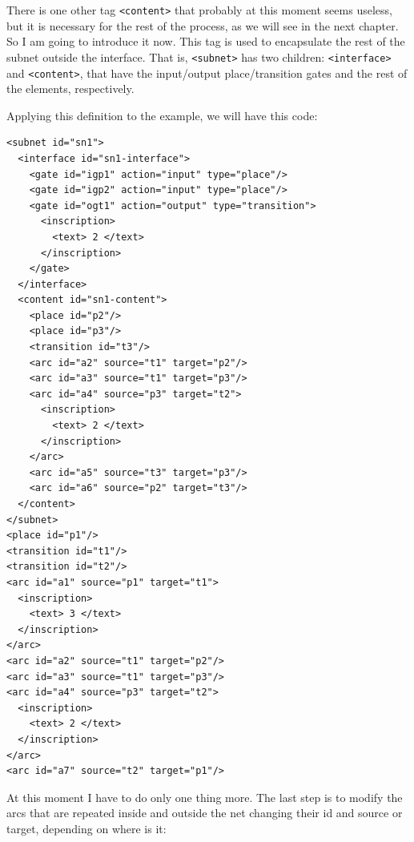 There is one other tag \texttt{<content>} that
probably at this moment seems useless, but it is necessary for the rest of the process, as we will see in the next chapter. So I am going to introduce it now. This tag is used to encapsulate the rest of the subnet outside the interface. That is, \texttt{<subnet>} has two children:
\texttt{<interface>} and \texttt{<content>},
that have the input/output place/transition gates and the rest of the elements, respectively.

Applying this definition to the example, we will have this code:

\begin{lstlisting}
<subnet id="sn1">
  <interface id="sn1-interface">
    <gate id="igp1" action="input" type="place"/>
    <gate id="igp2" action="input" type="place"/>
    <gate id="ogt1" action="output" type="transition">
      <inscription>
        <text> 2 </text>
      </inscription>
    </gate>
  </interface>
  <content id="sn1-content">
    <place id="p2"/>
    <place id="p3"/>
    <transition id="t3"/>
    <arc id="a2" source="t1" target="p2"/>
    <arc id="a3" source="t1" target="p3"/>
    <arc id="a4" source="p3" target="t2">
      <inscription>
        <text> 2 </text>
      </inscription>
    </arc>
    <arc id="a5" source="t3" target="p3"/>
    <arc id="a6" source="p2" target="t3"/>
  </content>
</subnet>
<place id="p1"/>
<transition id="t1"/>
<transition id="t2"/>
<arc id="a1" source="p1" target="t1">
  <inscription>
    <text> 3 </text>
  </inscription>
</arc>
<arc id="a2" source="t1" target="p2"/>
<arc id="a3" source="t1" target="p3"/>
<arc id="a4" source="p3" target="t2">
  <inscription>
    <text> 2 </text>
  </inscription>
</arc>
<arc id="a7" source="t2" target="p1"/>
\end{lstlisting}

At this moment I have to do only one thing more. The last step is to modify
the arcs that are repeated inside and outside the net changing their id and
source or target, depending on where is it:

